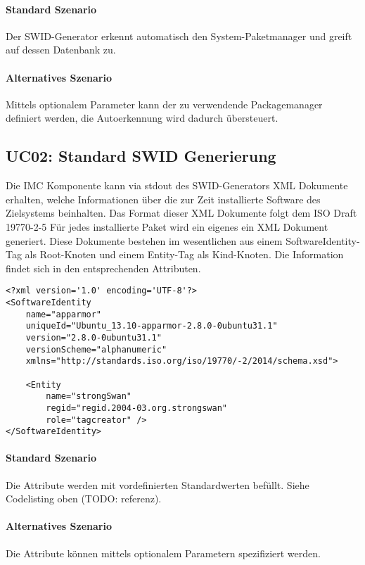 \paragraph{Standard Szenario}
Der SWID-Generator erkennt automatisch den System-Paketmanager und greift auf
dessen Datenbank zu.

\paragraph{Alternatives Szenario}
Mittels optionalem Parameter kann der zu verwendende Packagemanager definiert
werden, die Autoerkennung wird dadurch übersteuert.

\subsection{UC02: Standard SWID Generierung}

Die IMC Komponente kann via stdout des SWID-Generators XML Dokumente erhalten, welche Informationen über die zur Zeit installierte Software des Zielsystems beinhalten.
Das Format dieser XML Dokumente folgt dem ISO Draft 19770-2-5
Für jedes installierte Paket wird ein eigenes ein XML Dokument generiert.
Diese Dokumente bestehen im wesentlichen aus einem SoftwareIdentity-Tag als Root-Knoten und einem Entity-Tag als Kind-Knoten. Die Information findet sich in den entsprechenden Attributen.

\begin{verbatim}
<?xml version='1.0' encoding='UTF-8'?>
<SoftwareIdentity
    name="apparmor"
    uniqueId="Ubuntu_13.10-apparmor-2.8.0-0ubuntu31.1"
    version="2.8.0-0ubuntu31.1"
    versionScheme="alphanumeric"
    xmlns="http://standards.iso.org/iso/19770/-2/2014/schema.xsd">

    <Entity
        name="strongSwan"
        regid="regid.2004-03.org.strongswan"
        role="tagcreator" />
</SoftwareIdentity>
\end{verbatim}

\paragraph{Standard Szenario}
Die Attribute werden mit vordefinierten Standardwerten befüllt. Siehe Codelisting oben (TODO: referenz).

\paragraph{Alternatives Szenario}
Die Attribute können mittels optionalem Parametern spezifiziert werden.

